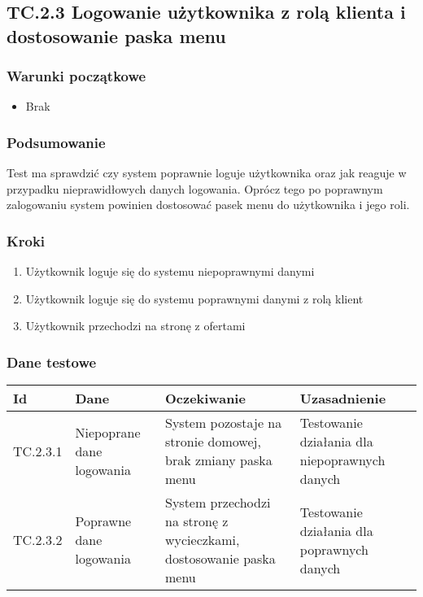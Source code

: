 \documentclass[a4paper,15pt]{article}
\begin{document}
\newpage
\begin{framed}
\subsection{TC.2.3 Logowanie użytkownika z rolą klienta i dostosowanie paska menu}


\vspace{0.5cm}

\subsubsection{Warunki początkowe}
\begin{itemize}
\item Brak
\end{itemize}

\subsubsection{Podsumowanie}
Test ma sprawdzić czy system poprawnie loguje użytkownika oraz jak reaguje w przypadku nieprawidłowych danych logowania. Oprócz tego po poprawnym zalogowaniu system powinien dostosować pasek menu do użytkownika i jego roli. 

\subsubsection{Kroki}
\begin{enumerate}
\item Użytkownik loguje się do systemu niepoprawnymi danymi
\item Użytkownik loguje się do systemu poprawnymi danymi z rolą klient
\item Użytkownik przechodzi na stronę z ofertami
\end{enumerate}

\subsubsection{Dane testowe}

\begin{center}
\begin{tabular}{ |C{1.5cm}|C{3cm}|C{4cm}|C{4cm}| } 
 \hline
 \textbf{Id} & \textbf{Dane} & \textbf{Oczekiwanie} & \textbf{Uzasadnienie} \\ \hline
 TC.2.3.1 & Niepoprane dane logowania & System pozostaje na stronie domowej, brak zmiany paska menu & Testowanie działania dla niepoprawnych danych \\ \hline
 TC.2.3.2 & Poprawne dane logowania & System przechodzi na stronę z wycieczkami, dostosowanie paska menu & Testowanie działania dla poprawnych danych \\ \hline
\end{tabular}
\end{center}

\end{framed}
\end{document}
